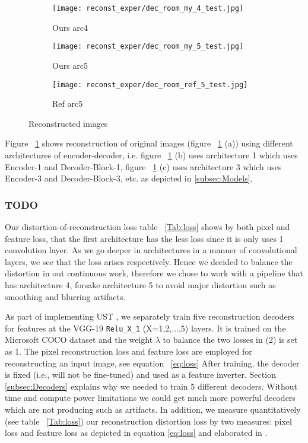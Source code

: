 \begin{figure}[H]
\begin{subfigure}[b]{0.13\linewidth}
		\texttt{[image: reconst\_exper/dec\_room\_my\_4\_test.jpg]} %
		\caption{Ours arc4}
	\end{subfigure}
	\begin{subfigure}[b]{0.13\linewidth}
		\texttt{[image: reconst\_exper/dec\_room\_my\_5\_test.jpg]} %
		\caption{Ours arc5}
	\end{subfigure}
	\begin{subfigure}[b]{0.13\linewidth}
		\texttt{[image: reconst\_exper/dec\_room\_ref\_5\_test.jpg]} %
		\caption{Ref arc5}	
	\end{subfigure}
	\caption{Reconstructed images}
	\label{fig:reconstruction}
\end{figure}
Figure ~\ref{fig:reconstruction} shows reconstruction of original images (figure ~\ref{fig:reconstruction} (a)) using different architectures of encoder-decoder, i.e. figure ~\ref{fig:reconstruction} (b) uses architecture 1 which uses Encoder-1 and Decoder-Block-1, figure ~\ref{fig:reconstruction} (c) uses architecture 3 which uses Encoder-3 and Decoder-Block-3, etc. as depicted in \ref{subsec:Models}.

\subsubsection{TODO}
Our distortion-of-reconstruction loss table ~\ref{Tab:loss} shows by both pixel and feature loss, that the first architecture has the less loss since it is only uses 1 convolution layer. As we go deeper in architectures in a manner of convolutional layers, we see that the loss arises respectively. Hence we decided to balance the distortion in out continuous work, therefore we chose to work with a pipeline that has architecture 4, forsake architecture 5 to avoid major distortion such as smoothing and blurring artifacts.

As part of implementing UST \cite{bib11}, we separately train five reconstruction decoders for features
at the VGG-19 \verb|Relu_X_1| (X=1,2,...,5) layers. It is trained on the Microsoft COCO dataset \cite{bib10} and
the weight $\lambda$ to balance the two losses in (2) is set as 1.
The pixel reconstruction loss \cite{bib22} and feature loss \cite{bib22, bib17} are employed for reconstructing an input image, see equation ~\ref{eq:loss}
After training, the decoder is fixed (i.e., will not be fine-tuned) and used as a feature inverter.\newline
Section \ref{subsec:Decoders} explains why we needed to train 5 different decoders. Without time and compute power limitations we could get much more powerful decoders which are not producing such as artifacts.
In addition, we measure quantitatively (see table ~\ref{Tab:loss}) our reconstruction distortion loss by two measures: pixel loss and feature loss as depicted in equation \ref{eq:loss} and elaborated in \cite{bib22, bib17}.\newline\\

